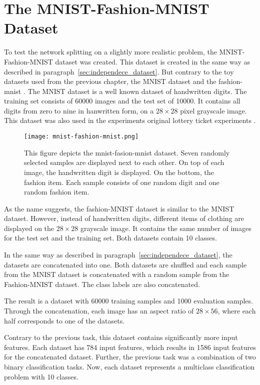 \section{The MNIST-Fashion-MNIST Dataset}\label{sec:mnist}
To test the network splitting on a slightly more realistic problem, the MNIST-Fashion-MNIST dataset was created.
This dataset is created in the same way as described in paragraph~\ref{sec:independece_dataset}.
But contrary to the toy datasets used from the previous chapter, the MNIST dataset \autocite{mnist} and the fashion-mnist \autocite{fashion}.
The MNIST dataset is a well known dataset of handwritten digits. 
The training set consists of 60000 images and the test set of 10000.
It contains all digits from zero to nine in hanwritten form, on a $28 \times 28$ pixel grayscale image.
This dataset was also used in the experiments original lottery ticket experiments \autocite{DBLP:conf/iclr/FrankleC19}.

\begin{figure}[ht]
    \centering
    \texttt{[image: mnist-fashion-mnist.png]}
    \caption{
        This figure depicts the mnist-fasion-mnist dataset. 
        Seven randomly selected samples are displayed next to each other.
        On top of each image, the handwritten digit is displayed. 
        On the bottom, the fashion item.
        Each sample consists of one random digit and one random fashion item.
    }\label{fig:mnist_fashion}
\end{figure}

As the name suggests, the fashion-MNIST dataset \autocite{fashion} is similar to the MNIST dataset.
However, instead of handwritten digits, different items of clothing are displayed on the $28 \times 28$ grayscale image.
It contains the same number of images for the test set and the training set.
Both datasets contain 10 classes.

In the same way as described in paragraph~\ref{sec:independece_dataset}, the datasets are concatenated into one.
Both datasets are shuffled and each sample from the MNIST dataset is concatenated with a random sample from the Fashion-MNIST dataset.
The class labels are also concatenated.

The result is a dataset with 60000 training samples and 1000 evaluation samples.
Through the concatenation, each image has an aspect ratio of $28 \times 56$, where each half corresponds to one of the datasets.

Contrary to the previous task, this dataset contains significantly more input features.
Each dataset has 784 input features, which results in 1586 input features for the concatenated dataset.
Further, the previous task was a combination of two binary classification tasks.
Now, each dataset represents a multiclass classification problem with 10 classes.

